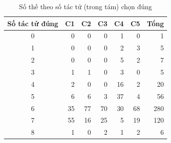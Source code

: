 \begin{table}[H]
  \centering
  \small
  \caption{Số thế theo số tác tử (trong tám) chọn đúng}
  \label{tab:cs-ct-dokho}
  \begin{tabular}{crrrrrr}
    \toprule
    Số tác tử đúng & C1 & C2 & C3 & C4 & C5 & Tổng \\
    \midrule
    0 & 0 & 0 & 0 & 1 & 0 & 1 \\
    1 & 0 & 0 & 0 & 2 & 3 & 5 \\
    2 & 0 & 0 & 0 & 5 & 2 & 7 \\
    3 & 1 & 1 & 0 & 3 & 0 & 5 \\
    4 & 2 & 0 & 0 & 16 & 2 & 20 \\
    5 & 6 & 6 & 3 & 37 & 4 & 56 \\
    6 & 35 & 77 & 70 & 30 & 68 & 280 \\
    7 & 55 & 16 & 25 & 5 & 19 & 120 \\
    8 & 1 & 0 & 2 & 1 & 2 & 6 \\
    \bottomrule
  \end{tabular}
\end{table}
